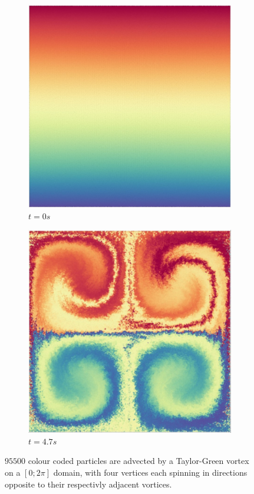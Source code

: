 \begin{figure}
  \centering
  \begin{subfigure}[t]{0.4\textwidth}
    \includegraphics[width=\textwidth]{images/density/taylorgreen_t0.jpg}
    \caption{$t=0s$}
  \end{subfigure}
  \begin{subfigure}[t]{0.4\textwidth}
    \includegraphics[width=\textwidth]{images/density/taylorgreen_t4_70.jpg}
    \caption{$t=4.7s$}
  \end{subfigure}
  \caption{$95 500$ colour coded particles are advected by a Taylor-Green vortex on a $[0;2\pi]$ domain, with four vertices each spinning in directions opposite to their respectivly adjacent vortices.}
  \label{fig:taylor-green-vortex}
\end{figure}

